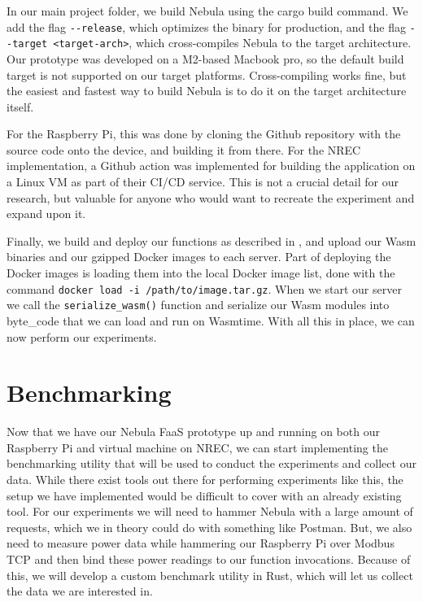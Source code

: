 \documentclass[
  table]{report}
\begin{document}
In our main project folder, we build Nebula using the cargo build
command. We add the flag \texttt{-\/-release}, which optimizes the
binary for production, and the flag
\texttt{-\/-target\ \textless{}target-arch\textgreater{}}, which
cross-compiles Nebula to the target architecture. Our prototype was
developed on a M2-based Macbook pro, so the default build target is not
supported on our target platforms. Cross-compiling works fine, but the
easiest and fastest way to build Nebula is to do it on the target
architecture itself.

For the Raspberry Pi, this was done by cloning the Github repository
with the source code onto the device, and building it from there. For
the \ac{NREC} implementation, a Github action was implemented for
building the application on a Linux VM as part of their CI/CD service.
This is not a crucial detail for our research, but valuable for anyone
who would want to recreate the experiment and expand upon it.

Finally, we build and deploy our functions as described in
, and upload our \ac{Wasm} binaries and our
gzipped Docker images to each server. Part of deploying the Docker
images is loading them into the local Docker image list, done with the
command \texttt{docker\ load\ -i\ /path/to/image.tar.gz}. When we start
our server we call the \texttt{serialize\_wasm()} function and serialize
our \ac{Wasm} modules into byte\_code that we can load and run on
Wasmtime. With all this in place, we can now perform our experiments.

\section{Benchmarking}
\label{sect:impl_bench}

Now that we have our Nebula \ac{FaaS} prototype up and running on both
our Raspberry Pi and virtual machine on \ac{NREC}, we can start
implementing the benchmarking utility that will be used to conduct the
experiments and collect our data. While there exist tools out there for
performing experiments like this, the setup we have implemented would be
difficult to cover with an already existing tool. For our experiments we
will need to hammer Nebula with a large amount of requests, which we in
theory could do with something like Postman. But, we also need to
measure power data while hammering our Raspberry Pi over Modbus TCP and
then bind these power readings to our function invocations. Because of
this, we will develop a custom benchmark utility in Rust, which will let
us collect the data we are interested in.
\end{document}
